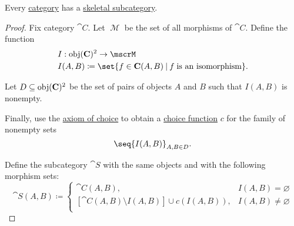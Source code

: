 \begin{theorem}\label{thm:skeletal_subcategory_existence}
  Every \hyperref[def:category]{category} has a \hyperref[def:skeletal_category]{skeletal subcategory}.
\end{theorem}
\begin{proof}
  Fix category \( \cat{C} \). Let \( \mscrM \) be the set of all morphisms of \( \cat{C} \). Define the function
  \begin{equation*}
    \begin{aligned}
      &I: \obj(\cat{C})^2 \to \mscrM \\
      &I(A, B) \coloneqq \set{ f \in \cat{C}(A, B) \given f \T{is an isomorphism} }.
    \end{aligned}
  \end{equation*}

  Let \( D \subseteq \operatorname{obj}(\operatorname{\mathbf{C}})^2 \) be the set of pairs of objects \( A \) and \( B \) such that \( I(A, B) \) is nonempty.

  Finally, use the \hyperref[def:zfc/choice]{axiom of choice} to obtain a \hyperref[def:choice_function]{choice function} \( c \) for the family of nonempty sets
  \begin{equation*}
    \seq{ I(A, B) }_{A, B \in D}.
  \end{equation*}

  Define the subcategory \( \cat{S} \) with the same objects and with the following morphism sets:
  \begin{equation*}
    \cat{S}(A, B) \coloneqq \begin{cases}
      \cat{C}(A, B),                                     &I(A, B) = \varnothing \\
      [\cat{C}(A, B) \setminus I(A, B)] \cup c(I(A, B)), &I(A, B) \neq \varnothing \\
    \end{cases}
  \end{equation*}
\end{proof}
